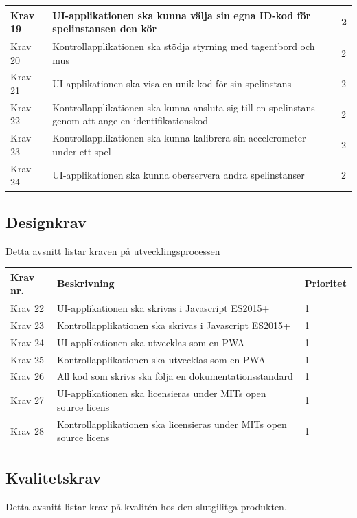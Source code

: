 \documentclass[10pt]{article}
\begin{document}
\begin{tabular}{| p{2cm} | p{8cm} | p{2cm}|}
		Krav 19 & UI-applikationen ska kunna välja sin egna ID-kod för spelinstansen den kör & 2 \\ \hline
		Krav 20 & Kontrollapplikationen ska stödja styrning med tagentbord och mus & 2 \\ \hline
		Krav 21 & UI-applikationen ska visa en unik kod för sin spelinstans & 2 \\ \hline
		Krav 22 & Kontrollapplikationen ska kunna ansluta sig till en spelinstans genom att ange en identifikationskod & 2 \\ \hline
		Krav 23 & Kontrollapplikationen ska kunna kalibrera sin accelerometer under ett spel & 2 \\ \hline
		Krav 24 & UI-applikationen ska kunna oberservera andra spelinstanser & 2 \\ \hline
		
		
		
		
	\end{tabular}
	
	\subsection{Designkrav}
	Detta avsnitt listar kraven på utvecklingsprocessen
	
	\begin{tabular}{| p{2cm} | p{8cm} | p{2cm}|}
		\hline
		\textbf{Krav nr.} & \textbf{Beskrivning} & \textbf{Prioritet} \\ \hline
		
		Krav 22 & UI-applikationen ska skrivas i Javascript ES2015+ & 1 \\ \hline
		Krav 23 & Kontrollapplikationen ska skrivas i Javascript ES2015+ & 1 \\ \hline
		Krav 24 & UI-applikationen ska utvecklas som en PWA & 1 \\ \hline
		Krav 25 & Kontrollapplikationen ska utvecklas som en PWA & 1 \\ \hline
		Krav 26 & All kod som skrivs ska följa en dokumentationsstandard & 1 \\ \hline
		Krav 27 & UI-applikationen ska licensieras under MITs open source licens & 1 \\ \hline
		Krav 28 & Kontrollapplikationen ska licensieras under MITs open source licens & 1 \\ \hline
	\end{tabular}

	\subsection{Kvalitetskrav}
	Detta avsnitt listar krav på kvalitén hos den slutgilitga produkten.
	
\end{document}
